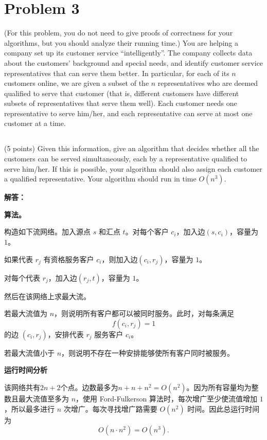 \documentclass[12pt,a4paper]{article}
\begin{document}
\section{Problem 3}

(For this problem, you do not need to give proofs of correctness for your algorithms, but you should analyze their running time.) You are helping a company set up its customer service ``intelligently''. The company collects data about the customers' background and special needs, and identify customer service representatives that can serve them better. In particular, for each of its $n$ customers online, we are given a subset of the $n$ representatives who are deemed qualified to serve that customer (that is, different customers have different subsets of representatives that serve them well). Each customer needs one representative to serve him/her, and each representative can serve at most one customer at a time.

\subsection{}

 (5 points) Given this information, give an algorithm that decides whether all the customers can be served simultaneously, each by a representative qualified to serve him/her. If this is possible, your algorithm should also assign each customer a qualified representative. Your algorithm should run in time $O(n^3)$.

\begin{answerbox}
\textbf{解答：}

\textbf{算法。}

构造如下流网络。加入源点 $s$ 和汇点 $t$。对每个客户 $c_i$，加入边$(s,c_i)$，容量为 $1$。

如果代表 $r_j$ 有资格服务客户 $c_i$，则加入边$(c_i,r_j)$，容量为 $1$。

对每个代表 $r_j$，加入边$(r_j,t)$，容量为 $1$。

然后在该网络上求最大流。

若最大流值为 $n$，则说明所有客户都可以被同时服务。此时，对每条满足
\[
  f(c_i,r_j)=1
\]
的边 $(c_i,r_j)$，安排代表 $r_j$ 服务客户 $c_i$。

若最大流值小于 $n$，则说明不存在一种安排能够使所有客户同时被服务。

\textbf{运行时间分析}

该网络共有$2n+2$个点。边数最多为$n+n+n^2=O(n^2)$。因为所有容量均为整数且最大流值至多为 $n$，使用 Ford-Fulkerson 算法时，每次增广至少使流值增加 $1$，所以最多进行 $n$ 次增广。每次寻找增广路需要 $O(n^2)$ 时间。因此总运行时间为
\[
  O(n\cdot n^2)=O(n^3).
\]

\end{answerbox}
\end{document}

